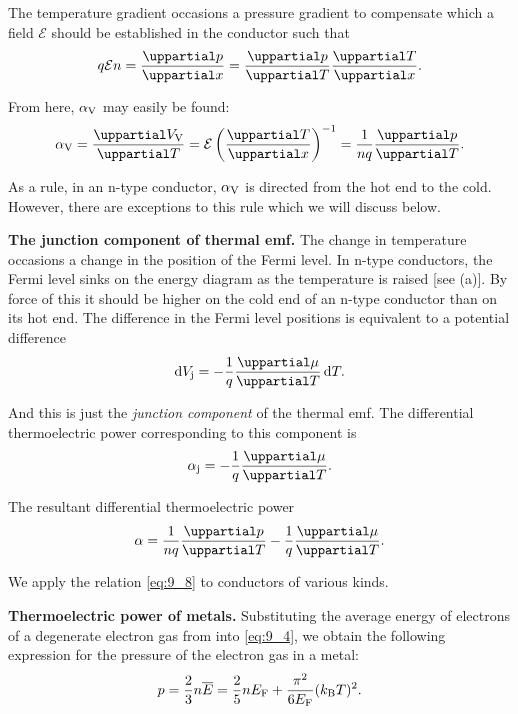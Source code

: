 The temperature gradient occasions a pressure gradient to compensate which a field $\mathcal{E}$ should be established in the conductor such that
\begin{equation*}
    q \mathcal{E} n = \diffpartial{p}{x} = \diffpartial{p}{T} \diffpartial{T}{x}.
\end{equation*}

\noindent
From here, $\alpha_{\text{V}}$ may easily be found:
\begin{equation}\label{eq:9_5}
    \ab{\alpha}{V} = \diffpartial{\ab{V}{V}}{T} = \mathcal{E} \parenthesis{\diffpartial{T}{x}}^{-1} = \frac{1}{nq} \diffpartial{p}{T}.
\end{equation}

As a rule, in an n-type conductor, $\alpha_{\text{V}}$ is directed from the hot end to the cold. However, there are exceptions to this rule which we will discuss below.

\textbf{The junction component of thermal emf.} The change in temperature occasions a change in the position of the Fermi level. In n-type conductors, the Fermi level sinks on the energy diagram as the temperature is raised [see (a)]. By force of this it should be higher on the cold end of an n-type conductor than on its hot end. The difference in the Fermi level positions is equivalent to a potential difference
\begin{equation}\label{eq:9_6}
    \deriv{\ab{V}{j}} = -\frac{1}{q} \diffpartial{\mu}{T}\, \deriv{T}.
\end{equation}

\noindent
And this is just the \textit{junction component} of the thermal emf. The differential thermoelectric power corresponding to this component is
\begin{equation}\label{eq:9_7}
    \ab{\alpha}{j} = -\frac{1}{q} \diffpartial{\mu}{T}.
\end{equation}

The resultant differential thermoelectric power
\begin{equation}\label{eq:9_8}
    \alpha = \frac{1}{nq} \diffpartial{p}{T} - \frac{1}{q} \diffpartial{\mu}{T}.
\end{equation}

\noindent
We apply the relation \eqref{eq:9_8} to conductors of various kinds.

\textbf{Thermoelectric power of metals.} Substituting the average energy of electrons of a degenerate electron gas from  into \eqref{eq:9_4}, we obtain the following expression for the pressure of the electron gas in a metal:
\begin{equation*}
    p = \frac{2}{3} n \overline{E} =\frac{2}{5} n E_{\text{F}} + \frac{\pi^2}{6E_{\text{F}}} (k_{\text{B}}T)^2.
\end{equation*}

